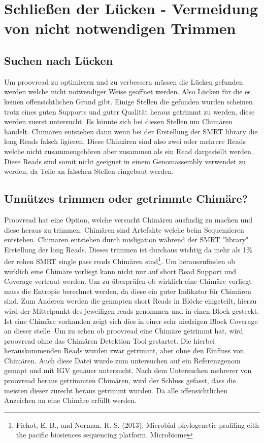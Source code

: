 \documentclass{scrartcl}
\begin{document}
\section{Schließen der Lücken - Vermeidung von nicht notwendigen Trimmen}
\label{sec-8}
\subsection{Suchen nach Lücken}
\label{sec-8-1}
Um proovread zu optimieren und zu verbessern müssen die Lücken gefunden werden welche nicht notwendiger Weise geöffnet werden.
Also Lücken für die es keinen offensichtlichen Grund gibt. Einige Stellen die gefunden wurden scheinen trotz eines guten Supports und guter Qualität
heraus getrimmt zu werden, diese werden zuerst untersucht. Es könnte sich bei diesen Stellen um Chimären handelt.
Chimären entstehen dann wenn bei der Erstellung der SMRT library die long Reads falsch ligieren. Diese Chimären sind also zwei oder mehrere Reads welche nicht zusammengehören
aber zusammen als ein Read dargestellt werden. Diese Reads sind somit nicht geeignet in einem Genomassembly verwendet zu werden, da Teile an falschen Stellen eingebaut werden.


\subsection{Unnützes trimmen oder getrimmte Chimäre?}
\label{sec-8-2}
Proovread hat eine Option, welche versucht Chimären ausfindig zu machen und diese heraus zu trimmen. 
Chimären sind Artefakte welche beim Sequenzieren entstehen. Chimären entstehen durch misligation während der SMRT "library" Erstellung der 
long Reads. Dieses trimmen ist durchaus wichtig da mehr als 1\% der rohen SMRT single pass reads Chimären sind\footnote{Fichot, E. B., and Norman, R. S. (2013).
Microbial phylogenetic profiling eith the pacific biosiences sequencing platform. Microbiome}. 
Um herauszufinden ob wirklich eine Chimäre vorliegt kann nicht nur auf short Read Support und Coverage vertraut werden. Um zu überprüfen ob
wirklich eine Chimäre vorliegt muss die Entropie berechnet werden, da diese ein guter Indikator für Chimären sind. Zum Anderen werden die gemapten
short Reads in Blöcke eingeteilt, hierzu wird der Mittelpunkt des jeweiligen reads genommen und in einen Block gesteckt. Ist eine Chimäre vorhanden 
zeigt sich dies in einer sehr niedrigen Block Coverage an dieser stelle. 
Um zu sehen ob proovread eine Chimäre getrimmt hat, wird proovread ohne das Chimären Detektion Tool gestartet. Die hierbei herauskommenden Reads wurden
zwar getrimmt, aber ohne den Einfluss von Chimären. Auch diese Datei wurde zum untersuchen auf ein Referenzgenom gemapt und mit IGV genauer untersucht. 
Nach dem Untersuchen mehrerer von proovread heraus getrimmten Chimären, wird der Schluss gefasst, dass die meisten dieser zurecht heraus getrimmt wurden. Da alle offensichtlichen
Anzeichen an eine Chimäre erfüllt werden.
\clearpage
\end{document}
